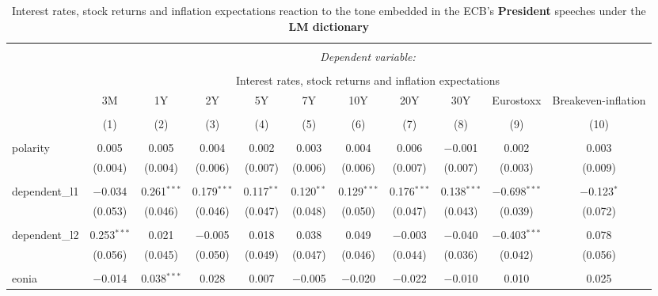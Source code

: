 
\begin{table}[!htbp] \centering 
  \caption [LM Tone \& Interest Rates, Stock Returns, Inflation Expectations: president speeches]{Interest rates, stock returns and inflation expectations reaction to the tone embedded in the ECB's \textbf{President} speeches under the \textbf{LM dictionary}} 
  \label{tab:assets_president_lm} 
  \begin{adjustbox}{width=1.25\textwidth}
\begin{tabular}{@{\extracolsep{5pt}}lcccccccccc} 
\\[-1.8ex]\hline 
\hline \\[-1.8ex] 
 & \multicolumn{10}{c}{\textit{Dependent variable:}} \\ 
\cline{2-11} 
\\[-1.8ex] & \multicolumn{10}{c}{Interest rates, stock returns and inflation expectations} \\ 
 & 3M & 1Y & 2Y & 5Y & 7Y & 10Y & 20Y & 30Y & Eurostoxx & Breakeven-inflation \\ 
\\[-1.8ex] & (1) & (2) & (3) & (4) & (5) & (6) & (7) & (8) & (9) & (10)\\ 
\hline \\[-1.8ex] 
 polarity & 0.005 & 0.005 & 0.004 & 0.002 & 0.003 & 0.004 & 0.006 & $-$0.001 & 0.002 & 0.003 \\ 
  & (0.004) & (0.004) & (0.006) & (0.007) & (0.006) & (0.006) & (0.007) & (0.007) & (0.003) & (0.009) \\ 
  & & & & & & & & & & \\ 
 dependent\_l1 & $-$0.034 & 0.261$^{***}$ & 0.179$^{***}$ & 0.117$^{**}$ & 0.120$^{**}$ & 0.129$^{***}$ & 0.176$^{***}$ & 0.138$^{***}$ & $-$0.698$^{***}$ & $-$0.123$^{*}$ \\ 
  & (0.053) & (0.046) & (0.046) & (0.047) & (0.048) & (0.050) & (0.047) & (0.043) & (0.039) & (0.072) \\ 
  & & & & & & & & & & \\ 
 dependent\_l2 & 0.253$^{***}$ & 0.021 & $-$0.005 & 0.018 & 0.038 & 0.049 & $-$0.003 & $-$0.040 & $-$0.403$^{***}$ & 0.078 \\ 
  & (0.056) & (0.045) & (0.050) & (0.049) & (0.047) & (0.046) & (0.044) & (0.036) & (0.042) & (0.056) \\ 
  & & & & & & & & & & \\ 
 eonia & $-$0.014 & 0.038$^{***}$ & 0.028 & 0.007 & $-$0.005 & $-$0.020 & $-$0.022 & $-$0.010 & 0.010 & 0.025 \\ 

\end{tabular}
\end{adjustbox}
\end{table}

